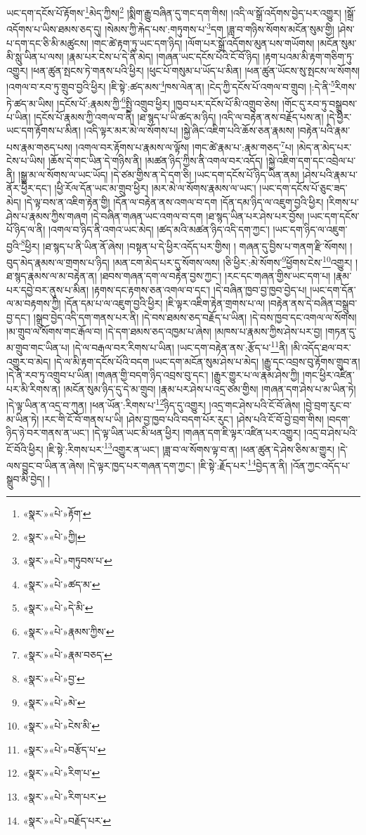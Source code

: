 ཡང་དག་དངོས་པོ་རྟོགས་\footnote{«སྣར་»«པེ་»རྟོག་}མེད་ཀྱིས།\footnote{«སྣར་»«པེ་»ཀྱི།} །སྨིག་རྒྱུ་བཞིན་དུ་གང་དག་གིས། །འདི་ལ་སྒྲོ་འདོགས་བྱེད་པར་འགྱུར། །སྒྲོ་འདོགས་པ་ཡིས་ཐམས་ཅད་དུ། །སེམས་ཀྱི་རྐེད་པས་:གཏུགས་པ་\footnote{«སྣར་»«པེ་»གཏུབས་པ་}དག །ཟླ་བ་གཉིས་སོགས་མངོན་སུམ་གྱི། །ཤེས་པ་དག་དང་ཅི་མི་མཚུངས། །གང་ཚེ་རྟག་ཏུ་ཡང་དག་ཉིད། །ལོག་པར་སྒྲོ་འདོགས་མུན་པས་གཡོགས། །མངོན་སུམ་མི་སླུ་ཡིན་པ་ལས། །རྣམ་པར་ངེས་པ་དེ་ནི་མེད། །གཞན་ཡང་དངོས་པོའི་ངོ་བོ་ཉིད། །རྟག་པའམ་མི་རྟག་གཅིག་ཏུ་འགྱུར། །ཕན་ཚུན་སྤངས་ཏེ་གནས་པའི་ཕྱིར། །ཕུང་པོ་གསུམ་པ་ཡོད་པ་མིན། །ཕན་ཚུན་ཡོངས་སུ་སྤངས་ལ་སོགས། །འགལ་བ་རབ་ཏུ་གྲུབ་བྱའི་ཕྱིར། །ཇི་སྟེ་:ཚད་མས་\footnote{«སྣར་»«པེ་»ཚད་མ་}ཁས་ལེན་ན། །ངེད་ཀྱི་དངོས་པོ་འགལ་བ་གྲུབ། །:དེ་ནི་\footnote{«སྣར་»«པེ་»དེ་མི་}རིགས་ཏེ་ཚད་མ་ཡིས། །དངོས་པོ་:རྣམས་ཀྱི་\footnote{«སྣར་»«པེ་»རྣམས་ཀྱིས་}སྤྱི་འགྲུབ་ཕྱིར། །ཁྱབ་པར་དངོས་པོ་མི་འགྲུབ་ཅེས། །གོང་དུ་རབ་ཏུ་བསྒྲུབས་པ་ཡིན། །དངོས་པོ་རྣམས་ཀྱི་འགལ་བ་ནི། །ཐ་སྙད་པ་ཡི་ཚད་མ་ཉིད། །འདི་ལ་བརྟེན་ནས་བརྗོད་པས་ན། །དེ་ཕྱིར་ཡང་དག་རྟོགས་པ་མིན། །འདི་ལྟར་མར་མེ་ལ་སོགས་པ། །སྐྱེ་ཞིང་འཇིག་པའི་ཆོས་ཅན་རྣམས། །བརྟེན་པའི་རྣམ་པས་རྣམ་གཅད་པས། །འགལ་བར་རྟོགས་པ་རྣམས་ལ་ལྟོས། །གང་ཚེ་རྣམ་པ་:རྣམ་གཅད་\footnote{«སྣར་»«པེ་»རྣམ་བཅད་}པ། །མེད་ན་མེད་པར་ངེས་པ་ཡིས། །ཆོས་དེ་གང་ཡིན་དེ་གཉིས་ནི། །མཚན་ཉིད་ཀྱིས་ནི་འགལ་བར་འདོད། །སྐྱེ་འཇིག་དག་དང་འབྲེལ་པ་ནི། །སྒྱུ་མ་ལ་སོགས་ལ་ཡང་ཡོད། །དེ་ཙམ་གྱིས་ན་དེ་དག་ཅི། །ཡང་དག་དངོས་པོ་ཉིད་ཡིན་ནམ། །ཤེས་པའི་རྣམ་པ་ནོར་ཕྱིར་དང་། །ཕྱི་རོལ་དོན་ཡང་མ་གྲུབ་ཕྱིར། །མར་མེ་ལ་སོགས་རྣམས་ལ་ཡང་། །ཡང་དག་དངོས་པོ་ཅུང་ཟད་མེད། །དེ་ལྟ་བས་ན་འཇིག་རྟེན་གྱི། །དོན་ལ་བརྟེན་ནས་འགལ་བ་དག །དོན་དམ་ཉིད་ལ་འཇུག་བྱའི་ཕྱིར། །རིགས་པ་ཤེས་པ་རྣམས་ཀྱིས་གཞག །དེ་བཞིན་གཞན་ཡང་འགལ་བ་དག །ཐ་སྙད་ཡིན་པར་ཤེས་པར་བྱོས། །ཡང་དག་དངོས་པོ་ཉིད་ལ་ནི། །འགལ་བ་ཉིད་ནི་འགའ་ཡང་མེད། །ཚད་མའི་མཚན་ཉིད་འདི་དག་ཀྱང་། །ཡང་དག་ཉིད་ལ་འཇུག་བྱའི་\footnote{«སྣར་»«པེ་»བྱ་}ཕྱིར། །ཐ་སྙད་པ་ནི་ཡིན་ནོ་ཞེས། །བསྟན་པ་དེ་ཕྱིར་འདོད་པར་གྱིས། །
གཞན་དུ་བྱིས་པ་གནག་རྫི་སོགས། །བུད་མེད་རྣམས་ལ་གྲགས་པ་ཉིད། །མན་ངག་མེད་པར་དུ་སོགས་ལས། །ཅི་ཕྱིར་:མེ་སོགས་\footnote{«སྣར་»«པེ་»མེ་}ཕྱོགས་ངེས་\footnote{«སྣར་»«པེ་»ངེས་མི་}འགྱུར། །ཐ་སྙད་རྣམས་ལ་མ་བརྟེན་ན། །ཐབས་གཞན་དག་ལ་བརྟེན་བྱས་ཀྱང་། །རང་དང་གཞན་གྱིས་ཡང་དག་པ། །རྣམ་པར་དབྱེ་བར་ནུས་པ་མིན། །རྟགས་དང་རྟགས་ཅན་འགལ་བ་དང་། །དེ་བཞིན་ཁྱབ་བྱ་ཁྱབ་བྱེད་པ། །ཡང་དག་དོན་ལ་མ་བརྟགས་ཀྱི། །དོན་དམ་པ་ལ་འཇུག་བྱའི་ཕྱིར། །ཇི་ལྟར་འཇིག་རྟེན་གྲགས་པ་ལ། །བརྟེན་ནས་དེ་བཞིན་བསྒྲུབ་བྱ་དང་། །སྒྲུབ་བྱེད་འདི་དག་གནས་པར་ནི། །དེ་བས་ཐམས་ཅད་བརྗོད་པ་ཡིན། །དེ་བས་ཁྱབ་དང་འགལ་ལ་སོགས། །མ་གྲུབ་ལ་སོགས་གང་རྒོལ་བ། །དེ་དག་ཐམས་ཅད་འཁྱམ་པ་ཞེས། །མཁས་པ་རྣམས་ཀྱིས་ཤེས་པར་བྱ། །གཏན་དུ་མ་གྲུབ་གང་ཡིན་པ། །དེ་ལ་བརྒལ་བར་རིགས་པ་ཡིན། །ཡང་དག་བརྟེན་ནས་:རྩོད་པ་\footnote{«སྣར་»«པེ་»བརྩོད་པ་}ནི། །མི་འདོད་ཐལ་བར་འགྱུར་བ་མེད། །དེ་ལ་མི་རྟག་དངོས་པོའི་བདག །ཡང་དག་མངོན་སུམ་ཤེས་པ་མེད། །རྒྱུ་དང་འབྲས་བུ་རྟོགས་གྲུབ་ན། །དེ་ནི་རབ་ཏུ་འགྲུབ་པ་ཡིན། །གཞན་གྱི་བདག་ཉིད་འབྲས་བུ་དང་། །རྒྱུར་གྱུར་པ་ལ་རྣམ་ཤེས་ཀྱི། །གང་ཕྱིར་འཛིན་པར་མི་རིགས་ན། །མངོན་སུམ་ཉིད་དུ་དེ་མ་གྲུབ། །རྣམ་པར་ཤེས་པ་འདྲ་ཙམ་གྱིས། །གཞན་དག་ཤེས་པ་མ་ཡིན་ཏེ། །དེ་ལྟ་ཡིན་ན་འདྲ་བ་ཀུན། །ཕན་ཡོན་:རིགས་པ་\footnote{«སྣར་»«པེ་»རིག་པ་}ཉིད་དུ་འགྱུར། །འདྲ་གང་ཤེས་པའི་ངོ་བོ་ཞེས། །བྱེ་བྲག་རུང་བ་མ་ཡིན་ཏེ། །རང་གི་ངོ་བོ་གནས་པ་ཡི། །ཤེས་བྱ་ཁྱབ་པའི་བདག་པོར་རུང་། །ཤེས་པའི་ངོ་བོ་བྱེ་བྲག་གིས། །བདག་ཉིད་ཉེ་བར་གནས་ན་ཡང་། །དེ་ལྟ་ཡིན་ཡང་མི་ཕན་ཕྱིར། །གཞན་དག་ཇི་ལྟར་འཛིན་པར་འགྱུར། །འདྲ་བ་ཤེས་པའི་ངོ་བོའི་ཕྱིར། །ཇི་སྟེ་:རིགས་པར་\footnote{«སྣར་»«པེ་»རིག་པར་}འགྱུར་ན་ཡང་། །ཟླ་བ་ལ་སོགས་ལྟ་བ་ན། །ཕན་ཚུན་དེ་ཤེས་ཅིས་མ་གྱུར། །དེ་ལས་བྱུང་བ་ཡིན་ན་ཞེས། །དེ་ལྟར་ཁྱད་པར་གཞན་དག་ཀྱང་། །ཇི་སྟེ་:རྗོད་པར་\footnote{«སྣར་»«པེ་»བརྗོད་པར་}བྱེད་ན་ནི། །འོན་ཀྱང་འདོད་པ་སྒྲུབ་མི་བྱེད། །
